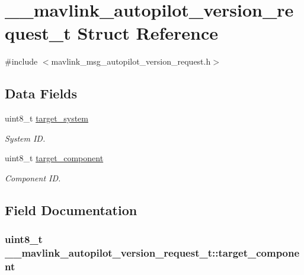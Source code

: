 \hypertarget{struct____mavlink__autopilot__version__request__t}{\section{\+\_\+\+\_\+mavlink\+\_\+autopilot\+\_\+version\+\_\+request\+\_\+t Struct Reference}
\label{struct____mavlink__autopilot__version__request__t}
}


{\ttfamily \#include $<$mavlink\+\_\+msg\+\_\+autopilot\+\_\+version\+\_\+request.\+h$>$}

\subsection*{Data Fields}
\begin{DoxyCompactItemize}
\item 
uint8\+\_\+t \hyperlink{struct____mavlink__autopilot__version__request__t_abe2ab85f583d911e5a7312b51aab7569}{target\+\_\+system}
\begin{DoxyCompactList}\small\item\em System I\+D. \end{DoxyCompactList}\item 
uint8\+\_\+t \hyperlink{struct____mavlink__autopilot__version__request__t_acffed4991624ee1ae3f16c797fcfb476}{target\+\_\+component}
\begin{DoxyCompactList}\small\item\em Component I\+D. \end{DoxyCompactList}\end{DoxyCompactItemize}


\subsection{Field Documentation}
\hypertarget{struct____mavlink__autopilot__version__request__t_acffed4991624ee1ae3f16c797fcfb476}{
\subsubsection[{target\+\_\+component}]{\setlength{\rightskip}{0pt plus 5cm}uint8\+\_\+t \+\_\+\+\_\+mavlink\+\_\+autopilot\+\_\+version\+\_\+request\+\_\+t\+::target\+\_\+component}}\label{struct____mavlink__autopilot__version__request__t_acffed4991624ee1ae3f16c797fcfb476}


